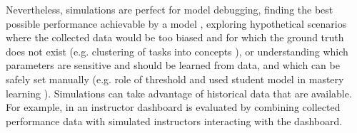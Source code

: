 Nevertheless, simulations are perfect for model debugging,
finding the best possible performance achievable by a model
\cite{mastery-overpractice-underpractice-tradeoff},
exploring hypothetical scenarios where the collected data would be too biased
and for which the ground truth does not exist
(e.g. clustering of tasks into concepts \cite[section\,3.3]{rihak-phd}),
or understanding which parameters are sensitive and should be learned from data,
and which can be safely set manually
(e.g. role of threshold and used student model in mastery learning
\cite{alg.mastery}). %
Simulations can take advantage of historical data that are available.
For example, in \cite{instructor-dashboard-realtime} an instructor dashboard is
evaluated by combining collected performance data %
with simulated instructors interacting with the dashboard.




%
%
%
